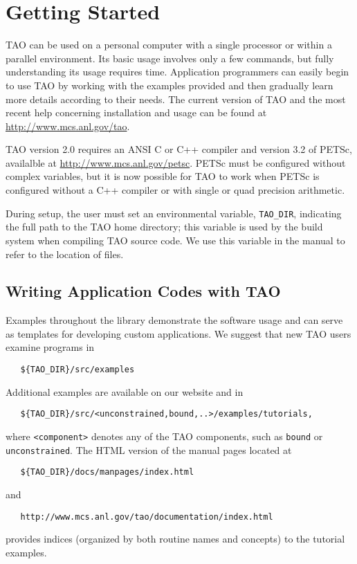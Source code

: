 \chapter{Getting Started}
\label{chapter:intro_tao}

TAO can be used on a personal
computer with a single processor or within a parallel environment.  
Its basic usage involves only a few commands, but fully 
understanding its usage requires time.
Application programmers can easily begin to use TAO by working with 
the examples provided and then gradually learn more details according to
their needs.  The current version of TAO and the most recent help 
concerning installation and usage can be found at  
\url{http://www.mcs.anl.gov/tao}.

TAO version 2.0 requires an ANSI C or C++ compiler and version 3.2 of PETSc, 
availalble at \url{http://www.mcs.anl.gov/petsc}.  PETSc must be configured 
without complex variables, but it is now possible for TAO to work when PETSc 
is configured without a C++ compiler or with single or quad precision 
arithmetic.

During setup, the user must set an environmental variable, 
\texttt{TAO\_DIR}, indicating the full path to 
the TAO home directory; this variable is used by the build
system when compiling TAO source code.  We use this variable in the
manual to refer to the location of files.

\section{Writing Application Codes with TAO}

Examples throughout the library demonstrate the software usage and
can serve as templates for developing custom applications.  We suggest
that new TAO users examine programs in
\begin{verbatim}
   ${TAO_DIR}/src/examples
\end{verbatim} %
\noindent
Additional examples are available on our website and in
\begin{verbatim}
   ${TAO_DIR}/src/<unconstrained,bound,..>/examples/tutorials,
\end{verbatim} 
\noindent
where \texttt{<component>}
denotes any of the TAO components, such as 
\texttt{bound} or \texttt{unconstrained}.
The HTML version of the manual pages located at
\begin{verbatim}
   ${TAO_DIR}/docs/manpages/index.html
\end{verbatim} %
\noindent
and
\begin{verbatim}
   http://www.mcs.anl.gov/tao/documentation/index.html
\end{verbatim}
\noindent
provides indices (organized by both routine names and concepts) to the
tutorial examples.

